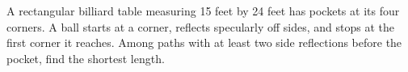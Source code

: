 A rectangular billiard table measuring 15 feet by 24 feet has pockets at its four corners. A ball starts at a corner, reflects specularly off sides, and stops at the first corner it reaches. Among paths with at least two side reflections before the pocket, find the shortest length.
